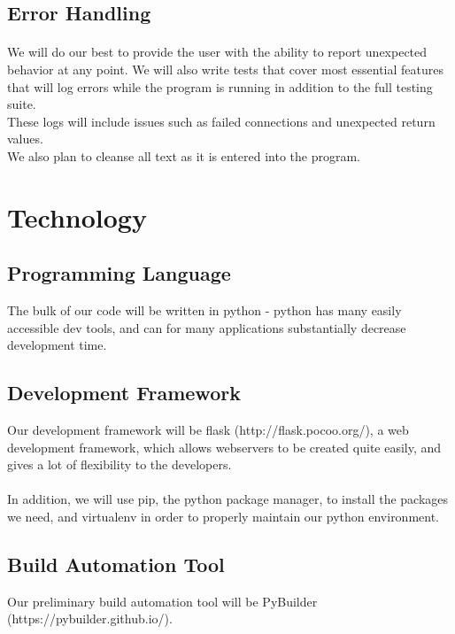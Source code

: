 \documentclass{article}
\begin{document}
\begin{figure}
   \centering
   
\end{figure}

\pagebreak
\subsection{Error Handling}

\paragraph{}

We will do our best to provide the user with the ability to report unexpected behavior at any point. We will also write tests that cover most essential features that will log errors while the program is running in addition to the full testing suite.\\

These logs will include issues such as failed connections and unexpected return values.\\

We also plan to cleanse all text as it is entered into the program.

\section{Technology}

\subsection{Programming Language}
The bulk of our code will be written in python - python has many easily accessible dev tools, and can for many applications substantially decrease development time. 
\subsection{Development Framework}
Our development framework will be flask (http://flask.pocoo.org/), a web development framework, which allows webservers to be created quite easily, and gives a lot of flexibility to the developers. \\
\\
In addition, we will use pip, the python package manager, to install the packages we need, and virtualenv in order to properly maintain our python environment. 
\subsection{Build Automation Tool}
Our preliminary build automation tool will be PyBuilder (https://pybuilder.github.io/).
\end{document}
